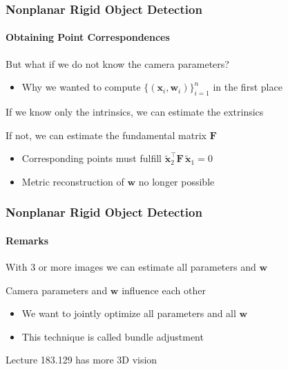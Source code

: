 \documentclass[xetex,professionalfont]{beamer}
\renewcommand{\vec}[1]{\ensuremath{\mathbf{#1}}}
\newcommand{\vw}{\vec{w}}
\newcommand{\vx}{\vec{x}}
\newcommand{\vF}{\vec{F}}
\renewcommand\emph[1]{\textcolor{tuwcvl_inf_red}{#1}}
\begin{document}

\begin{frame}
\frametitle{Nonplanar Rigid Object Detection}
\framesubtitle{Obtaining Point Correspondences}

But what if we do not know the camera parameters?
\begin{itemize}
    \item Why we wanted to compute $\{(\vx_i,\vw_i)\}_{i=1}^n$ in the first place
\end{itemize}

\bigskip
If we know only the intrinsics, we can estimate the extrinsics

\bigskip
If not, we can estimate the \emph{fundamental matrix} $\vF$
\begin{itemize}
    \item Corresponding points must fulfill $\tilde{\vx}_2^\top\vF\,\tilde{\vx}_1=0$
    \item Metric reconstruction of $\vw$ no longer possible %
\end{itemize}

\end{frame}


\begin{frame}
\frametitle{Nonplanar Rigid Object Detection}
\framesubtitle{Remarks}

With 3 or more images we can estimate all parameters and $\vw$ %

\bigskip
Camera parameters and $\vw$ influence each other
\begin{itemize}
    \item We want to jointly optimize all parameters and all $\vw$
    \item This technique is called \emph{bundle adjustment}
\end{itemize}

\bigskip
Lecture 183.129 has more 3D vision

\end{frame}

\end{document}
